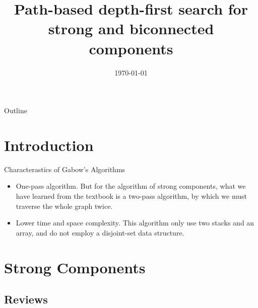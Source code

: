 \documentclass{beamer}
\title[Path-based DFS] %
{Path-based depth-first search for strong and biconnected components}
\author[Harold N. Gabow] %
{\textbf{Author of the paper: Harold N. Gabow}\newline\newline
 {Reported by: T.T. Liu \and D.P. Xu \and B.Y. Chen } }
\date{\scriptsize{\today} }
\begin{document}
\begin{frame}
  \titlepage
\end{frame}

\begin{frame}{Outline}
  \tableofcontents
\end{frame}





\section{Introduction}

\begin{frame}{Characterastics of Gabow's Algorithms}
	\begin{itemize}
		\item
		\alert{One-pass algorithm.} But for the algorithm of strong components, what we have learned from
		the textbook is a two-pass algorithm, by which we must traverse the whole graph twice. 
		\item
		\alert{Lower time and space complexity.} This algorithm only use two stacks and an array, and do not
		employ a disjoint-set data structure.
	\end{itemize}
\end{frame}


\section{Strong Components}

\subsection{Reviews}
\end{document}
